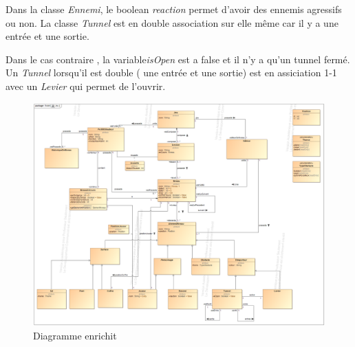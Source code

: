 Dans la classe \emph{Ennemi}, le boolean \emph{reaction} permet d'avoir des ennemis agressifs ou non. La classe \emph{Tunnel} est en double association sur elle même car il y a une entrée et une
sortie. 

Dans le cas contraire , la variable\emph{isOpen} est a false et il n'y a qu'un tunnel fermé. Un \emph{Tunnel} lorsqu'il est double ( une entrée et une sortie)
est en assiciation 1-1 avec un \emph{Levier} qui permet de l'ouvrir.


\begin{figure}
    \centering
	\includegraphics[width=\textwidth]{assets/Jeu}
	\caption{Diagramme enrichit}
	\label{fig:Jeu}
\end{figure}

\newpage